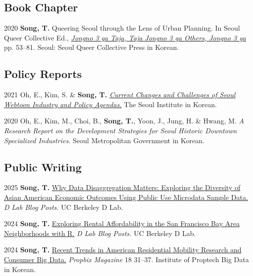 \documentclass[10pt,letterpaper]{article}
\begin{document}
\subsection{Book Chapter}
\begin{tablist}
  \item[2020] \tab{}\textbf{Song, T.} Queering Seoul through the Lens of Urban Planning. In Seoul Queer Collective Ed., \emph{\href{http://www.kyobobook.co.kr/product/detailViewKor.laf?ejkGb=KOR&mallGb=KOR&barcode=9791197096501}{Jongno 3 ga Taja, Taja Jongno 3 ga Others, Jongno 3 ga}} pp. 53–81. Seoul: Seoul Queer Collective Press in Korean.
\end{tablist}

\subsection{Policy Reports}
\begin{tablist}
  \item[2021] \tab{}Oh, E., Kim, S. \& \textbf{Song, T.} \emph{\href{https://www.si.re.kr/bbs/view.do?key=2024100039&pstSn=2111190001}{Current Changes and Challenges of Seoul Webtoon Industry and Policy Agendas.}} The Seoul Institute in Korean.
  \item[2020] \tab{}Oh, E., Kim, M., Choi, B., \textbf{Song, T.}, Yoon, J., Jung, H. \& Hwang, M. \emph{A Research Report on the Development Strategies for Seoul Historic Downtown Specialized Industries.} Seoul Metropolitan Government in Korean.
\end{tablist}

\subsection{Public Writing}
\begin{tablist}
  \item[2025] \tab{}\textbf{Song, T.} \href{https://medium.com/@dlab-berkeley/why-data-disaggregation-matters-exploring-the-diversity-of-asian-american-economic-outcomes-using-8b96e5dcc9a4}{Why Data Disaggregation Matters: Exploring the Diversity of Asian American Economic Outcomes Using Public Use Microdata Sample Data.} \emph{D Lab Blog Posts.} UC Berkeley D Lab.
  \item[2024] \tab{}\textbf{Song, T.} \href{https://medium.com/@dlab-berkeley/exploring-rental-affordability-in-the-san-francisco-bay-area-neighborhoods-with-r-c4383f7553e7}{Exploring Rental Affordability in the San Francisco Bay Area Neighborhoods with R.} \emph{D Lab Blog Posts.} UC Berkeley D Lab.
  \item[2024] \tab{}\textbf{Song, T.} \href{https://www.kahps.org/data/prbx/pdf_44_7}{Recent Trends in American Residential Mobility Research and Consumer Big Data.} \emph{Propbix Magazine} 18 31–37. Institute of Proptech Big Data in Korean.
\end{tablist}
\end{document}
